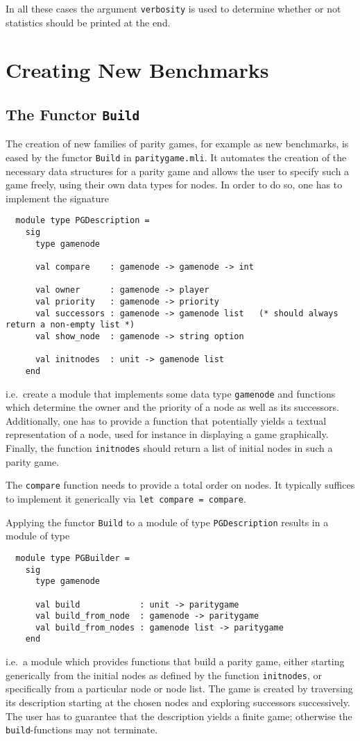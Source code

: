 In all these cases the argument \verb+verbosity+ is used to determine whether or not statistics should be printed
at the end.

\section{Creating New Benchmarks}

\subsection{The Functor \texttt{Build}}
The creation of new families of parity games, for example as new benchmarks, is eased by the functor \texttt{Build} in
\texttt{paritygame.mli}. It automates the creation of the necessary data structures for a parity game and allows the
user to specify such a game freely, using their own data types for nodes. In order to do so, one has to implement the
signature
\begin{verbatim}
  module type PGDescription =
    sig
      type gamenode

      val compare    : gamenode -> gamenode -> int

      val owner      : gamenode -> player
      val priority   : gamenode -> priority
      val successors : gamenode -> gamenode list   (* should always return a non-empty list *)
      val show_node  : gamenode -> string option

      val initnodes  : unit -> gamenode list 
    end
\end{verbatim}
i.e.\ create a module that implements some data type \verb#gamenode# and functions which determine the owner and the
priority of a node as well as its successors. Additionally, one has to provide a function that potentially yields a
textual representation of a node, used for instance in displaying a game graphically. Finally, the function \verb#initnodes#
should return a list of initial nodes in such a parity game. 

The \verb#compare# function needs to provide a total order on nodes. It typically suffices to implement it generically via
\verb#let compare = compare#.

Applying the functor \verb#Build# to a module of type \verb#PGDescription# results in a module of type
\begin{verbatim}
  module type PGBuilder = 
    sig
      type gamenode
	     
      val build            : unit -> paritygame
      val build_from_node  : gamenode -> paritygame
      val build_from_nodes : gamenode list -> paritygame
    end
\end{verbatim}
i.e.\ a module which provides functions that build a parity game, either starting generically from the initial nodes as 
defined by the function \verb#initnodes#, or specifically from a particular node or node list. The game is created by 
traversing its description starting at the chosen nodes and exploring successors successively. The user has to guarantee
that the description yields a finite game; otherwise the \verb#build#-functions may not terminate.

